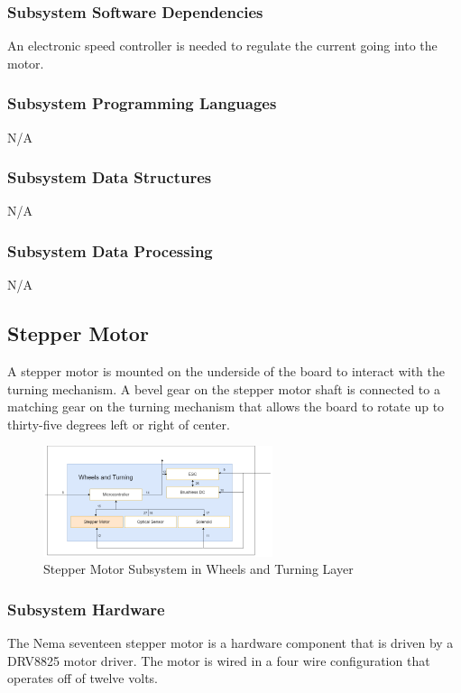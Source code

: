\subsubsection{Subsystem Software Dependencies}
An electronic speed controller is needed to regulate the current going into the motor.

\subsubsection{Subsystem Programming Languages}
N/A

\subsubsection{Subsystem Data Structures}
N/A

\subsubsection{Subsystem Data Processing}
N/A

\subsection{Stepper Motor}
A stepper motor is mounted on the underside of the board to interact with the turning mechanism. A bevel gear on the stepper motor shaft is connected to a matching gear on the turning mechanism that allows the board to rotate up to thirty-five degrees left or right of center.

\begin{figure}[h!]
	\centering
 	\includegraphics[width=0.60\textwidth]{images/Keaton/Stepper.png}
 \caption{Stepper Motor Subsystem in Wheels and Turning Layer}
\end{figure}

\subsubsection{Subsystem Hardware}
The Nema seventeen stepper motor is a hardware component that is driven by a DRV8825 motor driver. The motor is wired in a four wire configuration that operates off of twelve volts.

